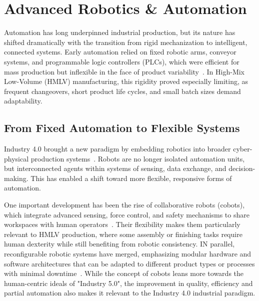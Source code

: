 \section{Advanced Robotics \& Automation}\label{sec:automation}

Automation has long underpinned industrial production, but its nature has shifted dramatically with the transition from rigid mechanization to intelligent, connected systems. Early automation relied on fixed robotic arms, conveyor systems, and programmable logic controllers (PLCs), which were efficient for mass production but inflexible in the face of product variability~\cite{brettel-how-virtualization-decentralization-and-networking, monsori-cpps-roots-expectations-rnd-challenges}. In High-Mix Low-Volume (HMLV) manufacturing, this rigidity proved especially limiting, as frequent changeovers, short product life cycles, and small batch sizes demand adaptability.

\subsection{From Fixed Automation to Flexible Systems}

Industry 4.0 brought a new paradigm by embedding robotics into broader cyber-physical production systems~\cite{monsori-cps-in-manufacturing}. Robots are no longer isolated automation units, but interconnected agents within systems of sensing, data exchange, and decision-making. This has enabled a shift toward more flexible, responsive forms of automation.

One important development has been the rise of collaborative robots (cobots), which integrate advanced sensing, force control, and safety mechanisms to share workspaces with human operators~\cite{villani-survey-on-human-robot-collaboration-in-industrial-settings}. Their flexibility makes them particularly relevant to HMLV production, where some assembly or finishing tasks require human dexterity while still benefiting from robotic consistency. IN parallel, reconfigurable robotic systems have merged, emphasizing modular hardware and software architectures that can be adapted to different product types or processes with minimal downtime~\cite{Bi-reconfigurable-manufacturing-systems-state-of-the-art,bortolini-reconfigurable-manufacturing-systems-literature-review}. While the concept of cobots leans more towards the human-centric ideals of "Industry 5.0", the improvement in quality, efficiency and partial automation also makes it relevant to the Industry 4.0 industrial paradigm.

